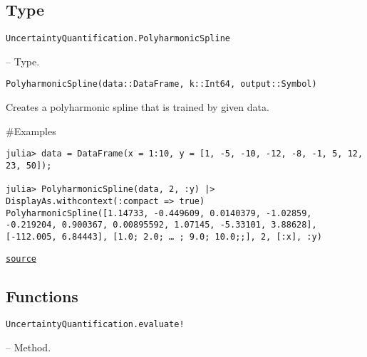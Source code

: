 \subsection{Type}



\label{5754456517017253880}{}

\hypertarget{12360404346968240388}{\texttt{UncertaintyQuantification.PolyharmonicSpline}}  -- {Type.}

\begin{adjustwidth}{2em}{0pt}


\begin{verbatim}
PolyharmonicSpline(data::DataFrame, k::Int64, output::Symbol)
\end{verbatim}

Creates a polyharmonic spline that is trained by given data.

\#Examples


\begin{verbatim}
julia> data = DataFrame(x = 1:10, y = [1, -5, -10, -12, -8, -1, 5, 12, 23, 50]);

julia> PolyharmonicSpline(data, 2, :y) |> DisplayAs.withcontext(:compact => true)
PolyharmonicSpline([1.14733, -0.449609, 0.0140379, -1.02859, -0.219204, 0.900367, 0.00895592, 1.07145, -5.33101, 3.88628], [-112.005, 6.84443], [1.0; 2.0; … ; 9.0; 10.0;;], 2, [:x], :y)
\end{verbatim}



\href{https://github.com/friesischscott/UncertaintyQuantification.jl/blob/f5ee6cce729f0d6a57979257379c942cdf42f86f/src/models/polyharmonicspline.jl#L1-L13}{\texttt{source}}


\end{adjustwidth}

\subsection{Functions}



\label{13536066633202303496}{}

\hypertarget{14940947651413538197}{\texttt{UncertaintyQuantification.evaluate!}}  -- {Method.}

